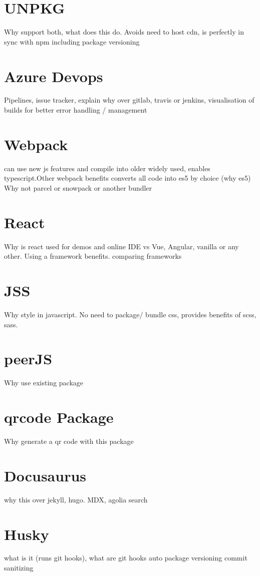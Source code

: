 \documentclass{l4proj}
\begin{document}
\section{UNPKG}
\text Why support both, what does this do. Avoids need to host cdn, is perfectly in sync with npm including package versioning
\section{Azure Devops}
\text Pipelines, issue tracker, explain why over gitlab, travis or jenkins, visualisation of builds for better error handling / management
\section{Webpack}
\text can use new js features and compile into older widely used, enables typescript.Other webpack benefits converts all code into es5 by choice (why es5)
Why not parcel or snowpack or another bundler
\section{React}
\text Why is react used for demos and online IDE vs Vue, Angular, vanilla or any other. Using a framework benefits.
comparing frameworks
\section{JSS}
\text Why style in javascript. No need to package/ bundle css, provides benefits of scss, sass.
\section{peerJS}
\text Why use existing package
\section{qrcode Package}
\text Why generate a qr code with this package
\section{Docusaurus}
\text why this over jekyll, hugo. MDX, agolia search
\section{Husky}
\text what is it (runs git hooks), what are git hooks
auto package versioning
commit sanitizing
\end{document}
